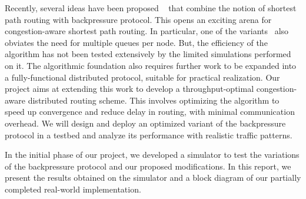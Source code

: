 Recently, several ideas have been proposed ~\cite{Srikant3, Austin1} that combine the notion of shortest path routing with backpressure protocol. This opens an exciting arena for congestion-aware shortest path routing. In particular, one of the variants~\cite{Srikant3} also obviates the need for multiple queues per node. But, the efficiency of the algorithm has not been tested extensively by the limited simulations performed on it. The algorithmic foundation also requires further work to be expanded into a fully-functional distributed protocol, suitable for practical realization. Our project aims at extending this work to develop a throughput-optimal congestion-aware distributed routing scheme. This involves optimizing the algorithm to speed up convergence and reduce delay in routing, with minimal communication overhead. We will design and deploy an optimized variant of the backpressure protocol in a testbed and analyze its performance with realistic traffic patterns.  

In the initial phase of our project, we developed a simulator to test the variations of the backpressure protocol and our proposed modifications. In this report, we present the results obtained on the simulator and a block diagram of our partially completed real-world implementation.